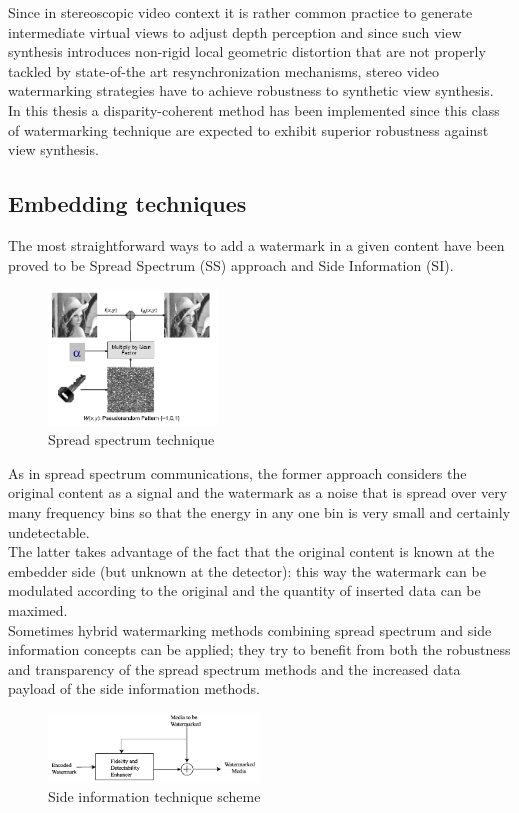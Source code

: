 Since in stereoscopic video context it is rather common practice to generate intermediate virtual views to adjust depth perception and since such view synthesis introduces non-rigid local geometric distortion that are not properly tackled by state-of-the art resynchronization mechanisms, stereo video watermarking strategies have to achieve robustness to synthetic view synthesis.\\
In this thesis a disparity-coherent method has been implemented since this class of watermarking technique are expected to exhibit superior robustness against view synthesis.



\subsection{Embedding techniques}
The most straightforward ways to add a watermark in a given content have been proved to be Spread Spectrum (SS) approach and Side Information (SI).\\
\begin{figure}[h!]
\centering
\includegraphics[width=0.4\textwidth]{./img/ss.png}
\caption{\small{Spread spectrum technique}}
\label{fig:ss}
\end{figure}
As in spread spectrum communications, the former approach considers the original
content as a signal and the watermark as a noise that is spread over very many frequency bins so that the energy in any one bin is very small and certainly undetectable.\\
The latter takes advantage of the fact that the original content is known at the
embedder side (but unknown at the detector): this way the watermark can be modulated  according to the original and the quantity of
inserted data can be maximed.\\

Sometimes hybrid watermarking methods combining spread spectrum and side information concepts can be applied; they try to benefit from both the robustness and transparency of the spread
spectrum methods and the increased data payload of the side information methods.
\begin{figure}[h!]
\centering
\includegraphics[width=0.5\textwidth]{./img/si.png}
\caption{\small{Side information technique scheme}}
\label{fig:si}
\end{figure}


